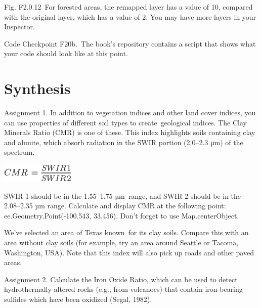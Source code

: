 \documentclass[
  letterpaper,
  DIV=11,
  numbers=noendperiod]{scrreprt}
\begin{document}
Fig. F2.0.12~For forested areas, the remapped layer has a value of 10,
compared with the original layer, which has a value of 2. You may have
more layers in your Inspector.

\begin{tcolorbox}[enhanced jigsaw, left=2mm, breakable, rightrule=.15mm, opacityback=0, colframe=quarto-callout-note-color-frame, colbacktitle=quarto-callout-note-color!10!white, arc=.35mm, opacitybacktitle=0.6, toptitle=1mm, colback=white, leftrule=.75mm, title=\textcolor{quarto-callout-note-color}{\faInfo}\hspace{0.5em}{Note}, toprule=.15mm, bottomtitle=1mm, titlerule=0mm, bottomrule=.15mm, coltitle=black]

Code Checkpoint F20b.~The book's repository contains a script that shows
what your code should look like at this point.~

\end{tcolorbox}

\hypertarget{synthesis}{%
\section*{Synthesis}\label{synthesis}}


Assignment 1. In addition to vegetation indices and other land cover
indices, you can use properties of different soil types to
create~geological indices. The Clay Minerals Ratio (CMR) is one of
these. This index highlights soils containing clay and alunite, which
absorb radiation in the SWIR portion (2.0--2.3 μm) of the spectrum.

\includegraphics{./F2/image3.png}

SWIR 1 should be in the 1.55--1.75 µm~range, and SWIR 2 should be in the
2.08--2.35 µm range. Calculate and display CMR at the following point:
ee.Geometry.Point(-100.543, 33.456). Don't forget to use
Map.centerObject.

We've selected an area of Texas known~for its clay soils. Compare this
with an area without clay soils (for example, try an area around Seattle
or Tacoma, Washington, USA). Note that this index will also pick up
roads and other paved areas.

Assignment 2. Calculate the Iron Oxide Ratio, which can be used to
detect hydrothermally altered rocks (e.g., from volcanoes) that contain
iron-bearing sulfides which have been oxidized (Segal, 1982).
\end{document}
